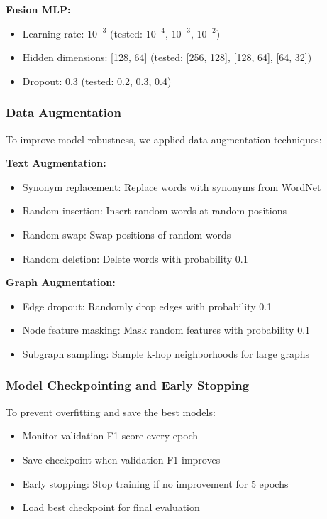 \textbf{Fusion MLP:}
\begin{itemize}
    \item Learning rate: $10^{-3}$ (tested: $10^{-4}$, $10^{-3}$, $10^{-2}$)
    \item Hidden dimensions: [128, 64] (tested: [256, 128], [128, 64], [64, 32])
    \item Dropout: 0.3 (tested: 0.2, 0.3, 0.4)
\end{itemize}

\subsubsection{Data Augmentation}

To improve model robustness, we applied data augmentation techniques:

\textbf{Text Augmentation:}
\begin{itemize}
    \item Synonym replacement: Replace words with synonyms from WordNet
    \item Random insertion: Insert random words at random positions
    \item Random swap: Swap positions of random words
    \item Random deletion: Delete words with probability 0.1
\end{itemize}

\textbf{Graph Augmentation:}
\begin{itemize}
    \item Edge dropout: Randomly drop edges with probability 0.1
    \item Node feature masking: Mask random features with probability 0.1
    \item Subgraph sampling: Sample k-hop neighborhoods for large graphs
\end{itemize}

\subsubsection{Model Checkpointing and Early Stopping}

To prevent overfitting and save the best models:

\begin{itemize}
    \item Monitor validation F1-score every epoch
    \item Save checkpoint when validation F1 improves
    \item Early stopping: Stop training if no improvement for 5 epochs
    \item Load best checkpoint for final evaluation
\end{itemize}

